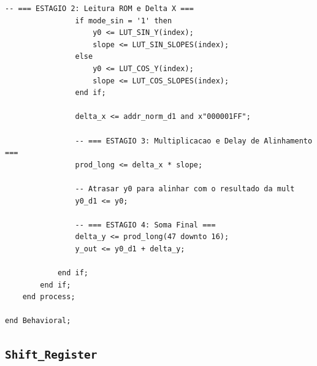 \documentclass[a4paper,12pt]{article}
\begin{document}
\begin{lstlisting}[style=vhdlstyle,
    caption={C\'odigo VHDL do \texttt{LUT\_Trig}.},
    label={lst:lut_trig}]
                -- === ESTAGIO 2: Leitura ROM e Delta X ===
                if mode_sin = '1' then
                    y0 <= LUT_SIN_Y(index);
                    slope <= LUT_SIN_SLOPES(index);
                else
                    y0 <= LUT_COS_Y(index);
                    slope <= LUT_COS_SLOPES(index);
                end if;

                delta_x <= addr_norm_d1 and x"000001FF";

                -- === ESTAGIO 3: Multiplicacao e Delay de Alinhamento ===
                prod_long <= delta_x * slope;

                -- Atrasar y0 para alinhar com o resultado da mult
                y0_d1 <= y0;

                -- === ESTAGIO 4: Soma Final ===
                delta_y <= prod_long(47 downto 16);
                y_out <= y0_d1 + delta_y;

            end if;
        end if;
    end process;

end Behavioral;
\end{lstlisting}

\subsection{\texttt{Shift\_Register}}
\end{document}
